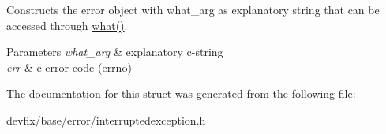 Constructs the error object with what\+\_\+arg as explanatory string that can be accessed through \hyperlink{structdevfix_1_1base_1_1error_1_1baseexception_a16327152a55d65b1e537825231fbd452}{what()}. 
\begin{DoxyParams}{Parameters}
{\em what\+\_\+arg} & explanatory c-\/string \\
\hline
{\em err} & c error code (errno) \\
\hline
\end{DoxyParams}


The documentation for this struct was generated from the following file\+:\begin{DoxyCompactItemize}
\item 
devfix/base/error/interruptedexception.\+h\end{DoxyCompactItemize}
